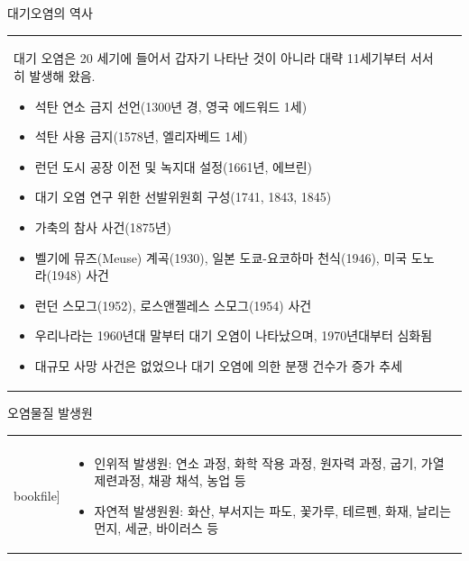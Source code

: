 \begin{frame}[t]{대기오염의 역사}
	\begin{tabular}{ll}
		\begin{minipage}[t]{0.94\textwidth}\scriptsize
			
			대기 오염은 20 세기에 들어서 갑자기 나타난 것이 아니라 대략 11세기부터 서서히 발생해 왔음.
			\begin{itemize}
				\item 석탄 연소 금지 선언(1300년 경, 영국 에드워드 1세)
				\item 석탄 사용 금지(1578년, 엘리자베드 1세)
				\item 런던 도시 공장 이전 및 녹지대 설정(1661년, 에브린)
				\item 대기 오염 연구 위한 선발위원회 구성(1741, 1843, 1845)
				\item 가축의 참사 사건(1875년)
				\item 벨기에 뮤즈(Meuse) 계곡(1930), 일본 도쿄-요코하마 천식(1946), 미국 도노라(1948) 사건
				\item 런던 스모그(1952), 로스앤젤레스 스모그(1954) 사건
				\item 우리나라는 1960년대 말부터 대기 오염이 나타났으며, 1970년대부터 심화됨
				\item 대규모 사망 사건은 없었으나 대기 오염에 의한 분쟁 건수가 증가 추세
				
			\end{itemize}

		\end{minipage}	
		&
		\begin{minipage}[t]{0.01\textwidth} \scriptsize	
			
		\end{minipage}
	\end{tabular}
\end{frame}



\begin{frame}[t]{오염물질 발생원}
	\begin{tabular}{ll}
		\begin{minipage}[t]{0.55\textwidth}\scriptsize
			\begin{figure}[t]
				\texttt{[image: \\bookfile]}
			\end{figure}
		\end{minipage}	
		&
		\begin{minipage}[t]{0.4\textwidth} \scriptsize	
			\begin{itemize}
				\item 인위적 발생원: 연소 과정, 화학 작용 과정, 원자력 과정, 굽기, 가열 제련과정, 채광 채석, 농업 등
				\item 자연적 발생원원: 화산, 부서지는 파도, 꽃가루, 테르펜, 화재, 날리는 먼지, 세균, 바이러스 등
			\end{itemize}

		\end{minipage}
	\end{tabular}
\end{frame}



